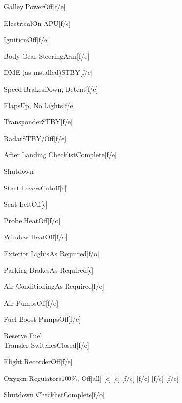 \documentclass[sim-use, blue_items, halfpage]{checklist}
\begin{document}
\begin{continuedchecklist}
	\item{Galley Power}{Off}[f/e]
	\item{Electrical}{On APU}[f/e]
	\item{Ignition}{Off}[f/e]
	\item{Body Gear Steering}{Arm}[f/e]
	\item{DME (as installed)}{STBY}[f/e]
	\item{Speed Brakes}{Down, Detent}[f/e]
	\item{Flaps}{Up, No Lights}[f/e]
	\item{Transponder}{STBY}[f/e]
	\item{Radar}{STBY/Off}[f/e]
	\item{After Landing Checklist}{Complete}[f/e]
\end{continuedchecklist}

\begin{checklist}{Shutdown}
	\item{Start Levers}{Cutoff}[c]
	\item{Seat Belt}{Off}[c]
	\item{Probe Heat}{Off}[f/o]
	\item{Window Heat}{Off}[f/o]
	\item{Exterior Lights}{As Required}[f/o]
	\item{Parking Brakes}{As Required}[c]
	\item{Air Conditioning}{As Required}[f/e]
	\item{Air Pumps}{Off}[f/e]
	\item{Fuel Boost Pumps}{Off}[f/e]
	\item{Reserve Fuel\\Transfer Switches}{Closed}[f/e]
	\item{Flight Recorder}{Off}[f/e]
	\item{Oxygen Regulators}{100\%, Off}[all]
	[f/e]
	[f/e]
	[f/e]
	[f/e]
	\item{Shutdown Checklist}{Complete}[f/o]
\end{checklist}
\end{document}

